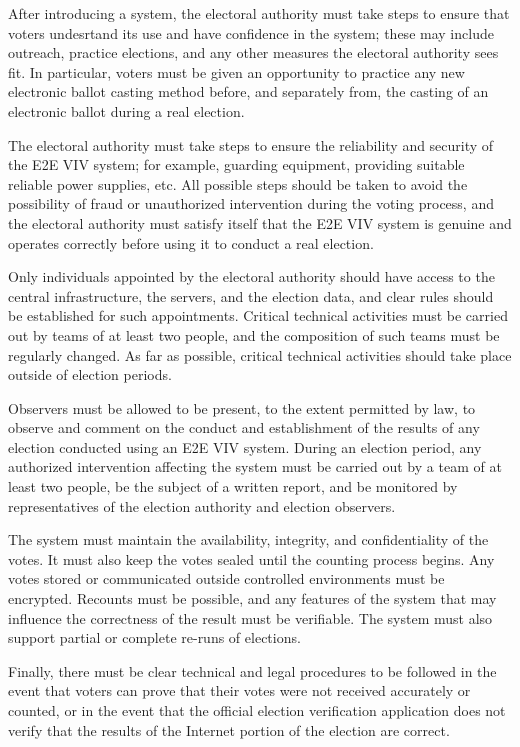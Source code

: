 After introducing a system, the electoral authority must take steps to
ensure that voters undesrtand its use and have confidence in the
system; these may include outreach, practice elections, and any other
measures the electoral authority sees fit. In particular, voters must
be given an opportunity to practice any new electronic ballot casting
method before, and separately from, the casting of an electronic
ballot during a real election.

The electoral authority must take steps to ensure the reliability and
security of the E2E VIV system; for example, guarding equipment,
providing suitable reliable power supplies, etc. All possible steps
should be taken to avoid the possibility of fraud or unauthorized
intervention during the voting process, and the electoral authority
must satisfy itself that the E2E VIV system is genuine and operates
correctly before using it to conduct a real election. 

Only individuals appointed by the electoral authority should have
access to the central infrastructure, the servers, and the election
data, and clear rules should be established for such
appointments. Critical technical activities must be carried out by
teams of at least two people, and the composition of such teams must
be regularly changed. As far as possible, critical technical
activities should take place outside of election periods. 

Observers must be allowed to be present, to the extent permitted by
law, to observe and comment on the conduct and establishment of the
results of any election conducted using an E2E VIV system. During an
election period, any authorized intervention affecting the system must
be carried out by a team of at least two people, be the subject of a
written report, and be monitored by representatives of the election
authority and election observers.

The system must maintain the availability, integrity, and
confidentiality of the votes. It must also keep the votes sealed until
the counting process begins. Any votes stored or communicated outside
controlled environments must be encrypted. Recounts must be possible,
and any features of the system that may influence the correctness of
the result must be verifiable. The system must also support partial or
complete re-runs of elections. 

Finally, there must be clear technical and legal procedures to be
followed in the event that voters can prove that their votes were not
received accurately or counted, or in the event that the official
election verification application does not verify that the results of
the Internet portion of the election are correct.

